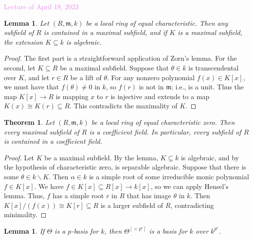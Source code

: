 \documentclass{amsart}[12pt]
\newcommand{\Apr}[1]{\textcolor{violet}{Lecture of April #1, 2023}}
\newcommand{\fm}{{\mathfrak m}}
\numberwithin{equation}{section}
\theoremstyle{plain} %
\newtheorem{thm}[equation]{Theorem}
\newtheorem{lem}[equation]{Lemma}
\theoremstyle{definition}
\theoremstyle{remark}
\begin{document}
\Apr{18}

\begin{lem} Let $(R,\fm,k)$ be a local ring of equal characteristic. Then any subfield of $R$ is contained in a maximal subfield, and if $K$ is a maximal subfield, the extension $K\subseteq k$ is algebraic.
\end{lem}
\begin{proof} The first part is a straightforward application of Zorn's lemma. For the second, let $K\subseteq R$ be a maximal subfield. Suppose that $\theta\in k$ is transcendental over $K$, and let $r\in R$ be a lift of $\theta$. For any nonzero polynomial $f(x)\in K[x]$, we must have that $f(\theta)\neq 0$ in $k$, so $f(r)$ is not in $\fm$; i.e., is a unit. Thus the map $K[x]\to R$ is mapping $x$ to $r$ is injective and extends to a map $K(x) \cong K(r) \subseteq R$. This contradicts the maximality of $K$.
\end{proof}

\begin{thm} Let $(R,\fm,k)$ be a local ring of equal characteristic zero. Then every maximal subfield of $R$ is  a coefficient field. In particular, every subfield of $R$ is contained in a coefficient field.
\end{thm}
\begin{proof}
Let $K$ be a maximal subfield. By the lemma, $K\subseteq k$ is algebraic, and by the hypothesis of characteristic zero, is separable algebraic. Suppose that there is some $\theta \in k\smallsetminus K$. Then $\alpha \in k$ is a simple root of some irreducible monic polynomial $f\in K[x]$. We have $f\in K[x]\subseteq R[x] \to k[x]$, so we can apply Hensel's lemma. Thus, $f$ has a simple root $r$ in $R$ that has image $\theta$ in $k$. Then $K[x]/(f(x)) \cong K[r] \subseteq R$ is a larger subfield of $R$, contradicting minimality.
\end{proof} 

\begin{lem} If $\Theta$ is a $p$-basis for $k$, then $\Theta^{[<p^e]}$ is a basis for $k$ over $k^{p^e}$.
\end{lem}
\end{document}
